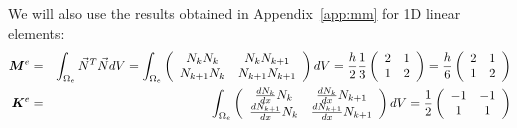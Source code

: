\newpage
We will also use the results obtained in Appendix~\ref{app:mm} for 1D linear elements:
\begin{eqnarray}
{\bm M}^e
&=&\int_{\Omega_e} \vec{N}^T \vec{N} dV
=\int_{\Omega_e} 
\left(
\begin{array}{cc}
N_k N_k & N_k N_{k+1} \\
N_{k+1} N_k & N_{k+1}N_{k+1}
\end{array}
\right)
dV 
= \frac{h}{2} \frac{1}{3} 
\left(
\begin{array}{cc}
2  & 1 \\
1 & 2
\end{array}
\right)
= 
\frac{h}{6}
\left(
\begin{array}{cc}
2  & 1 \\
1 & 2
\end{array}
\right)
\nonumber\\
{\bm K}^e &=&
\int_{\Omega_e} 
\left(
\begin{array}{cc}
\frac{dN_k}{dx} N_k     & \frac{dN_k}{dx} N_{k+1} \\
\frac{dN_{k+1}}{dx} N_k & \frac{dN_{k+1}}{dx} N_{k+1}
\end{array}
\right)
dV
=
\frac{1}{2}
\left(
\begin{array}{cc}
-1  & -1 \\
1 & 1
\end{array}
\right)
\end{eqnarray}



